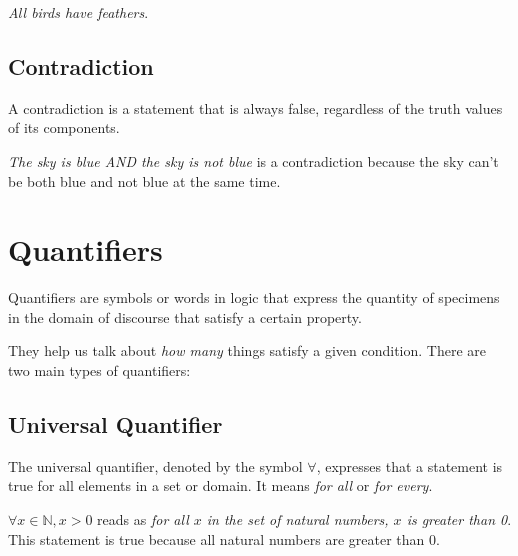 \documentclass{article}
\theoremstyle{mytheoremstyle}
\theoremstyle{mytheoremstyle}
\theoremstyle{myexamplestyle}
\begin{document}
\begin{example}
    \emph{All birds have feathers}.
\end{example}

\subsection{Contradiction}

\begin{definition}
    A contradiction is a statement that is always false, regardless of the truth values of its components.
\end{definition}

\begin{example}
    \emph{The sky is blue AND the sky is not blue} is a
    contradiction because the sky can't be both blue and not blue at
    the same time.
\end{example}

\newpage

\section{Quantifiers}

\begin{definition}
    Quantifiers are symbols or words in logic that express the
    quantity of specimens in the domain of discourse that satisfy a
    certain property.
\end{definition}

They help us talk about \emph{how many} things satisfy a given
condition. There are two main types of quantifiers:

\subsection{Universal Quantifier}

\begin{definition}
    The universal quantifier, denoted by the symbol $\forall$,
    expresses that a statement is true for all elements in a set or
    domain. It means \emph{for all} or \emph{for every}.
\end{definition}


\begin{example}
    $\forall x \in \mathbb{N}, x > 0$ reads as \emph{for all $x$ in
        the set of natural numbers, $x$ is greater than 0}. This
    statement is true because all natural numbers are greater than 0.
\end{example}
\end{document}
